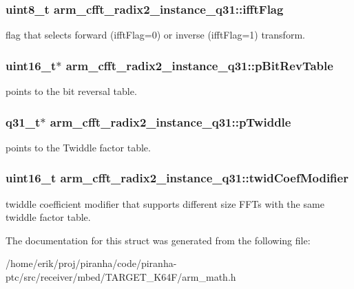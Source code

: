 \subsubsection[{\texorpdfstring{ifft\+Flag}{ifftFlag}}]{\setlength{\rightskip}{0pt plus 5cm}uint8\+\_\+t arm\+\_\+cfft\+\_\+radix2\+\_\+instance\+\_\+q31\+::ifft\+Flag}\hypertarget{structarm__cfft__radix2__instance__q31_a2607378ce64be16698bb8a3b1af8d3c8}{}\label{structarm__cfft__radix2__instance__q31_a2607378ce64be16698bb8a3b1af8d3c8}
flag that selects forward (ifft\+Flag=0) or inverse (ifft\+Flag=1) transform. 
\subsubsection[{\texorpdfstring{p\+Bit\+Rev\+Table}{pBitRevTable}}]{\setlength{\rightskip}{0pt plus 5cm}uint16\+\_\+t$\ast$ arm\+\_\+cfft\+\_\+radix2\+\_\+instance\+\_\+q31\+::p\+Bit\+Rev\+Table}\hypertarget{structarm__cfft__radix2__instance__q31_ada8e5264f4b22ff4c621817978994674}{}\label{structarm__cfft__radix2__instance__q31_ada8e5264f4b22ff4c621817978994674}
points to the bit reversal table. 
\subsubsection[{\texorpdfstring{p\+Twiddle}{pTwiddle}}]{\setlength{\rightskip}{0pt plus 5cm}q31\+\_\+t$\ast$ arm\+\_\+cfft\+\_\+radix2\+\_\+instance\+\_\+q31\+::p\+Twiddle}\hypertarget{structarm__cfft__radix2__instance__q31_a1d5bbe9a991e133f81652a77a7985d23}{}\label{structarm__cfft__radix2__instance__q31_a1d5bbe9a991e133f81652a77a7985d23}
points to the Twiddle factor table. 
\subsubsection[{\texorpdfstring{twid\+Coef\+Modifier}{twidCoefModifier}}]{\setlength{\rightskip}{0pt plus 5cm}uint16\+\_\+t arm\+\_\+cfft\+\_\+radix2\+\_\+instance\+\_\+q31\+::twid\+Coef\+Modifier}\hypertarget{structarm__cfft__radix2__instance__q31_ae63ca9193322cd477970c1d2086407d1}{}\label{structarm__cfft__radix2__instance__q31_ae63ca9193322cd477970c1d2086407d1}
twiddle coefficient modifier that supports different size F\+F\+Ts with the same twiddle factor table. 

The documentation for this struct was generated from the following file\+:\begin{DoxyCompactItemize}
\item 
/home/erik/proj/piranha/code/piranha-\/ptc/src/receiver/mbed/\+T\+A\+R\+G\+E\+T\+\_\+\+K64\+F/arm\+\_\+math.\+h\end{DoxyCompactItemize}
